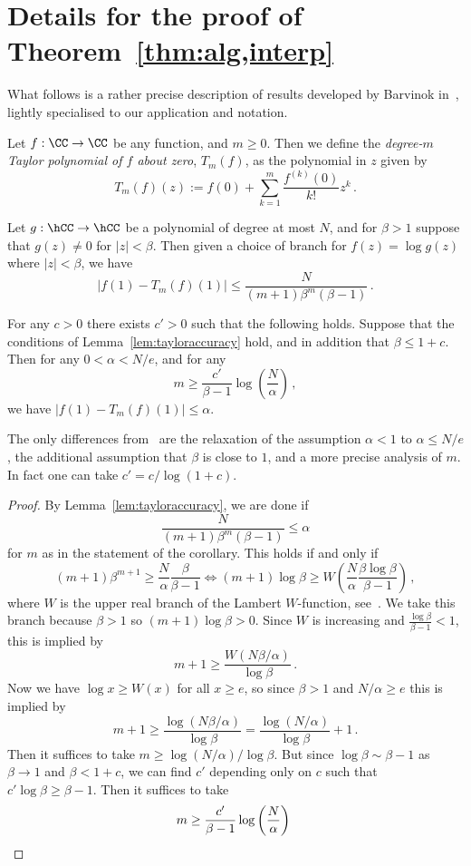 \appendix
\section{Details for the proof of Theorem~\ref{thm:alg,interp}}\label{app:interp,details}
%
What follows is a rather precise description of results developed by Barvinok in~\cite{Barvinok16,Barvinok18}, lightly specialised to our application and notation.
%
\begin{definition}\label{def:taylor}
Let $f:\CC\to\CC$ be any function, and $m\ge 0$. Then we define the \emph{degree-$m$ Taylor polynomial of $f$ about zero}, $T_m(f)$, as the polynomial in $z$ given by
\[
T_m(f)(z) := f(0) + \sum_{k=1}^m\frac{f^{(k)}(0)}{k!}z^k\,.
\]
\end{definition}
%
\begin{lemma}\label{lem:tayloraccuracy}
Let $g:\hCC\to\hCC$ be a polynomial of degree at most $N$, and for $\beta>1$ suppose that $g(z)\ne 0$ for $|z|<\beta$.
%
Then given a choice of branch for $f(z)=\log g(z)$ where $|z|<\beta$, we have 
\[
|f(1)-T_m(f)(1)| \le \frac{N}{(m+1)\beta^m(\beta-1)}\,.
\]
\end{lemma}
%
\begin{corollary}\label{cor:tayloreps}
For any $c>0$ there exists $c'>0$ such that the following holds.
Suppose that the conditions of Lemma~\ref{lem:tayloraccuracy} hold, and in addition that $\beta\le 1+c$. 
%
Then for any $0<\alpha<N/e$, and for any 
\[
m \ge \frac{c'}{\beta-1}\log\left(\frac{N}{\alpha}\right)\,,
\]
we have $|f(1)-T_m(f)(1)|\le \alpha$.
\end{corollary}
%
The only differences from~\cite[Corollary 2.2]{Barvinok18} are the relaxation of the assumption $\alpha<1$ to $\alpha\le N/e$, the additional assumption that $\beta$ is close to $1$, and a more precise analysis of $m$. 
In fact one can take $c'=c/\log(1+c)$.
%
\begin{proof}
By Lemma~\ref{lem:tayloraccuracy}, we are done if 
\[
\frac{N}{(m+1)\beta^m(\beta-1)} \le \alpha
\]
for $m$ as in the statement of the corollary. This holds if and only if
\[
(m+1)\beta^{m+1} \ge \frac{N}{\alpha}\frac{\beta}{\beta-1} \Longleftrightarrow
(m+1)\log\beta \ge W\left(\frac{N}{\alpha}\frac{\beta\log\beta}{\beta-1}\right)\,,
\]
where $W$ is the upper real branch of the Lambert $W$-function, see~\cite{CGHJK96}. We take this branch because $\beta> 1$ so $(m+1)\log\beta > 0$.
Since $W$ is increasing and $\frac{\log \beta}{\beta-1} <1$, this is implied by 
\[
m+1 \ge \frac{W(N\beta/\alpha)}{\log\beta}\,.
\]
Now we have $\log x \ge W(x)$ for all $x\ge e$, so since $\beta>1$ and $N/\alpha \ge e$ this is implied by 
\[
m+1 \ge \frac{\log(N\beta/\alpha)}{\log\beta} = \frac{\log(N/\alpha)}{\log\beta} + 1\,.
\]
Then it suffices to take $m\ge \log(N/\alpha)/\log\beta$. But since $\log\beta\sim\beta-1$ as $\beta\to1$ and $\beta< 1+c$, we can find $c'$ depending only on $c$ such that $c'\log\beta \ge \beta -1$. Then it suffices to take 
\[
m \ge \frac{c'}{\beta-1}\log\left(\frac{N}{\alpha}\right)\,\qedhere
\]
\end{proof}
